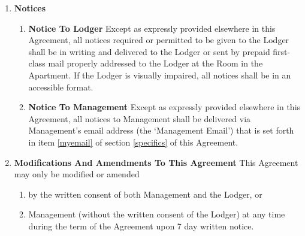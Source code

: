 \documentclass[12pt,letterpaper]{article}
\newcommand{\management}{Management}
\newcommand{\myemail}{Management Email}
\newcommand{\apt}{Apartment}
\newcommand{\room}{Room}
\newcommand{\lodger}{Lodger}
\begin{document}
\begin{enumerate}
\begin{enumerate}
			\item \textbf{Service Of Termination Notice} \label{service}
				\quad When a notice of termination requires service pursuant to California Code of Civil Procedure 1162, such service may be made by either: 
				\begin{enumerate}
					\item Personally delivering a copy to the \lodger{}; or, 
					\item If the \lodger{} is absent from the \room{} and from their usual place of business, service may be made by leaving a copy with some person of suitable age and discretion at their usual place of business, and sending a copy through the mail addressed to the \lodger{} at \apt{}; or, 
					\item If such place of business cannot be ascertained, or a person of suitable age or discretion there cannot be found, then service may be made by affixing a copy in a conspicuous place in the \room{}, and also sending a copy through the mail addressed to the \lodger{} at \apt{}.
				\end{enumerate}
		\end{enumerate}
	\item \textbf{Notices} \quad 
		\begin{enumerate} 
			\item \textbf{Notice To Lodger} \quad 
				Except as expressly provided elsewhere in this Agreement, all notices required or permitted to be given to the \lodger{} shall be in writing and delivered to the \lodger{} or sent by prepaid first-class mail properly addressed to the \lodger{} at the \room{} in the \apt{}. If the \lodger{} is visually impaired, all notices shall be in an accessible format. 
			\item \textbf{Notice To Management} \quad 
				Except as expressly provided elsewhere in this Agreement, all notices to \management{} shall be delivered via \management{}'s email address (the `\myemail{}') that is set forth in item \ref{myemail} of section \ref{specifics} of this Agreement{}.
		\end{enumerate}
	\item \textbf{Modifications And Amendments To This Agreement} \label{modifications}
		\quad This Agreement may only be modified or amended 
		\begin{enumerate}
			\item by the written consent of both \management{} and the \lodger{}, or 
			\item \management{} (without the written consent of the \lodger{}) at any time during the term of the Agreement upon 7 day written notice. 
		\end{enumerate}
				

\end{enumerate}
\end{document}
